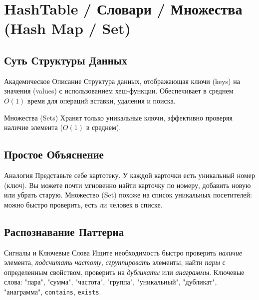
\section{HashTable / Словари / Множества (Hash Map / Set)}

\subsection{Суть Структуры Данных}
\begin{myblock}{Академическое Описание}
    Структура данных, отображающая ключи (keys) на значения (values) с использованием хеш-функции. Обеспечивает в среднем $O(1)$ время для операций вставки, удаления и поиска.
\end{myblock}
\begin{myblock}{Множества (Sets)}
    Хранят только уникальные ключи, эффективно проверяя наличие элемента ($O(1)$ в среднем).
\end{myblock}

\subsection{Простое Объяснение}
\begin{myblock}{Аналогия}
    Представьте себе картотеку. У каждой карточки есть уникальный номер (ключ). Вы можете почти мгновенно найти карточку по номеру, добавить новую или убрать старую. Множество (Set) похоже на список уникальных посетителей: можно быстро проверить, есть ли человек в списке.
\end{myblock}

\subsection{Распознавание Паттерна}
\begin{myblock}{Сигналы и Ключевые Слова}
    Ищите необходимость быстро проверить \emph{наличие} элемента, \emph{подсчитать частоту}, \emph{сгруппировать} элементы, найти \emph{пары} с определенным свойством, проверить на \emph{дубликаты} или \emph{анаграммы}. \newline
    Ключевые слова: "пара", "сумма", "частота", "группа", "уникальный", "дубликат", "анаграмма", \texttt{contains}, \texttt{exists}.
\end{myblock}

